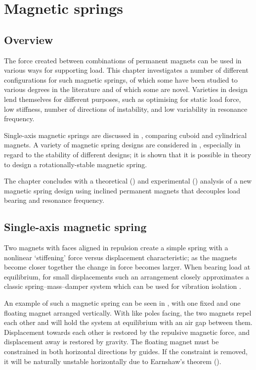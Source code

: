 \documentclass[11pt,a4paper]{memoir}
\begin{document}
\chapter{Magnetic springs}



\section{Overview}

The force created between combinations of permanent magnets can be used in various ways for supporting load.
This chapter investigates a number of different configurations for such magnetic springs, of which some have been studied to various degrees in the literature and of which some are novel.
Varieties in design lend themselves for different purposes, such as optimising for static load force, low stiffness, number of directions of instability, and low variability in resonance frequency.

Single-axis magnetic springs are discussed in , comparing cuboid and cylindrical magnets.
A variety of magnetic spring designs are considered in , especially in regard to the stability of different designs; it is shown that it is possible in theory to design a rotationally-stable magnetic spring.

The chapter concludes with a theoretical () and experimental () analysis of a new magnetic spring design using inclined permanent magnets that decouples load bearing and resonance frequency.

\section{Single-axis magnetic spring}

Two magnets with faces aligned in repulsion create a simple spring with a nonlinear `stiffening' force versus displacement characteristic; as the magnets become closer together the change in force becomes larger.
When bearing load at equilibrium, for small displacements such an arrangement closely approximates a classic spring--mass--damper system which can be used for vibration isolation \parencite{puppin2002}.

An example of such a magnetic spring can be seen in , with one fixed and one floating magnet arranged vertically.
With like poles facing, the two magnets repel each other and will hold the system at equilibrium with an air gap between them.
Displacement towards each other is restored by the repulsive magnetic force, and displacement away is restored by gravity.
The floating magnet must be constrained in both horizontal directions by guides.
If the constraint is removed, it will be naturally unstable horizontally due to Earnshaw's theorem ().
\end{document}
